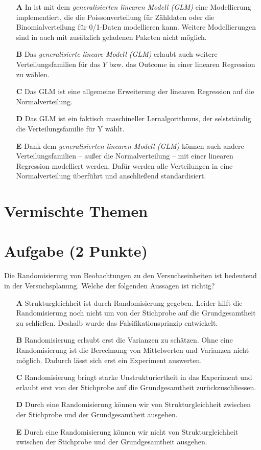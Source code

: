 \documentclass[a4paper, 9pt]{scrartcl}\usepackage[]{graphicx}\usepackage[]{xcolor}
\begin{document}
\begin{enumerate}
\item [\textbf{A} \msquare] In \Rlogo ist mit dem \textit{generalisierten linearen Modell (GLM)} eine Modellierung implementiert, die die Poissonverteilung für Zähldaten oder die Binomialverteilung für 0/1-Daten modellieren kann. Weitere Modellierungen sind in \Rlogo auch mit zusätzlich geladenen Paketen nicht möglich.
\item [\textbf{B} \msquare] Das \textit{generalisierte lineare Modell (GLM)} erlaubt auch weitere Verteilungsfamilien für das $Y$ bzw. das Outcome in einer linearen Regression zu wählen.
\item [\textbf{C} \msquare] Das GLM ist eine allgemeine Erweiterung der linearen Regression auf die Normalverteilung.
\item [\textbf{D} \msquare] Das GLM ist ein faktisch maschineller Lernalgorithmus, der selstständig die Verteilungsfamilie für Y wählt.
\item [\textbf{E} \msquare] Dank dem \textit{generalisierten linearen Modell (GLM)} können auch andere Verteilungsfamilien -- außer die Normalverteilung -- mit einer linearen Regression modelliert werden. Dafür werden alle Verteilungen in eine Normalverteilung überführt und anschließend standardisiert.
\end{enumerate}
\section*{Vermischte Themen}  

\section{Aufgabe \hfill (2 Punkte)}

Die Randomisierung von Beobachtungen zu den Versuchseinheiten
ist bedeutend in der Versuchsplanung. Welche der folgenden Aussagen ist richtig?



\begin{enumerate}
\item [\textbf{A} \msquare] Strukturgleichheit ist durch Randomisierung gegeben. Leider hilft die Randomisierung noch nicht um von der Stichprobe auf die Grundgesamtheit zu schließen. Deshalb wurde das Falsifikationsprinzip entwickelt.
\item [\textbf{B} \msquare] Randomisierung erlaubt erst die Varianzen zu schätzen. Ohne eine Randomisierung ist die Berechnung von Mittelwerten und Varianzen nicht möglich. Dadurch lässt sich erst ein Experiment auswerten.
\item [\textbf{C} \msquare] Randomisierung bringt starke Unstrukturiertheit in das Experiment und erlaubt erst von der Stichprobe auf die Grundgesamtheit zurückzuschliessen.
\item [\textbf{D} \msquare] Durch eine Randomisierung können wir von Strukturgleichheit zwischen der Stichprobe und der Grundgesamtheit ausgehen.
\item [\textbf{E} \msquare] Durch eine Randomisierung können wir nicht von Strukturgleichheit zwischen der Stichprobe und der Grundgesamtheit ausgehen.
\end{enumerate}
\end{document}
